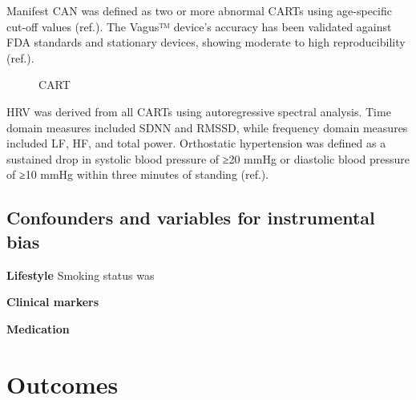 \documentclass[
  a4paper,
  headsepline=true,
  open=any]{scrbook}
\begin{document}
Manifest CAN was defined as two or more abnormal CARTs using
age-specific cut-off values (ref.). The Vagus™ device's accuracy has
been validated against FDA standards and stationary devices, showing
moderate to high reproducibility (ref.).

\begin{figure}

\begin{minipage}[t]{\linewidth}

{\centering 


\caption{CART}

}

\end{minipage}%

\end{figure}

HRV was derived from all CARTs using autoregressive spectral analysis.
Time domain measures included SDNN and RMSSD, while frequency domain
measures included LF, HF, and total power. Orthostatic hypertension was
defined as a sustained drop in systolic blood pressure of ≥20 mmHg or
diastolic blood pressure of ≥10 mmHg within three minutes of standing
(ref.).

\hypertarget{confounders-and-variables-for-instrumental-bias}{%
\section{Confounders and variables for instrumental
bias}\label{confounders-and-variables-for-instrumental-bias}}

\textbf{Lifestyle} Smoking status was

\textbf{Clinical markers}

\textbf{Medication}


\hypertarget{outcomes}{%
\chapter{Outcomes}\label{outcomes}}
\end{document}
